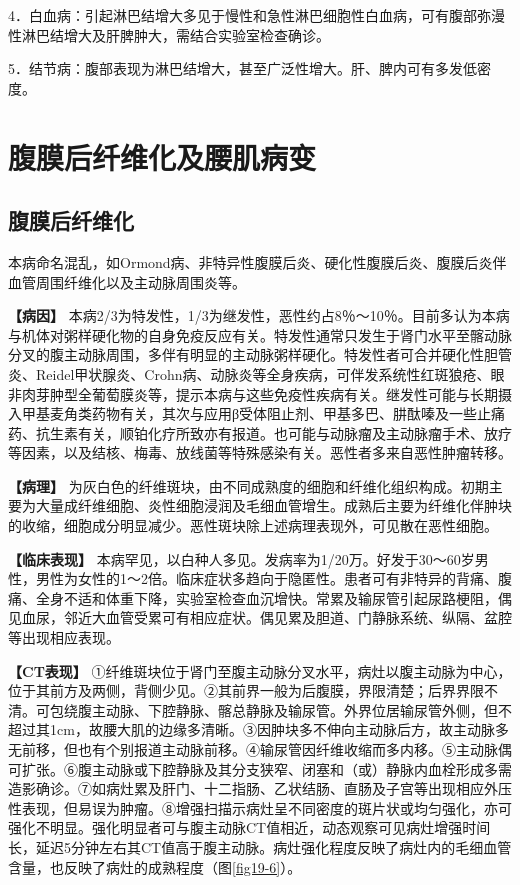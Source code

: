4．白血病：引起淋巴结增大多见于慢性和急性淋巴细胞性白血病，可有腹部弥漫性淋巴结增大及肝脾肿大，需结合实验室检查确诊。

5．结节病：腹部表现为淋巴结增大，甚至广泛性增大。肝、脾内可有多发低密度。

\section{腹膜后纤维化及腰肌病变}

\subsection{腹膜后纤维化}

本病命名混乱，如Ormond病、非特异性腹膜后炎、硬化性腹膜后炎、腹膜后炎伴血管周围纤维化以及主动脉周围炎等。

\textbf{【病因】}
本病2/3为特发性，1/3为继发性，恶性约占8％～10％。目前多认为本病与机体对粥样硬化物的自身免疫反应有关。特发性通常只发生于肾门水平至髂动脉分叉的腹主动脉周围，多伴有明显的主动脉粥样硬化。特发性者可合并硬化性胆管炎、Reidel甲状腺炎、Crohn病、动脉炎等全身疾病，可伴发系统性红斑狼疮、眼非肉芽肿型全葡萄膜炎等，提示本病与这些免疫性疾病有关。继发性可能与长期摄入甲基麦角类药物有关，其次与应用β受体阻止剂、甲基多巴、肼酞嗪及一些止痛药、抗生素有关，顺铂化疗所致亦有报道。也可能与动脉瘤及主动脉瘤手术、放疗等因素，以及结核、梅毒、放线菌等特殊感染有关。恶性者多来自恶性肿瘤转移。

\textbf{【病理】}
为灰白色的纤维斑块，由不同成熟度的细胞和纤维化组织构成。初期主要为大量成纤维细胞、炎性细胞浸润及毛细血管增生。成熟后主要为纤维化伴肿块的收缩，细胞成分明显减少。恶性斑块除上述病理表现外，可见散在恶性细胞。

\textbf{【临床表现】}
本病罕见，以白种人多见。发病率为1/20万。好发于30～60岁男性，男性为女性的1～2倍。临床症状多趋向于隐匿性。患者可有非特异的背痛、腹痛、全身不适和体重下降，实验室检查血沉增快。常累及输尿管引起尿路梗阻，偶见血尿，邻近大血管受累可有相应症状。偶见累及胆道、门静脉系统、纵隔、盆腔等出现相应表现。

\textbf{【CT表现】}
①纤维斑块位于肾门至腹主动脉分叉水平，病灶以腹主动脉为中心，位于其前方及两侧，背侧少见。②其前界一般为后腹膜，界限清楚；后界界限不清。可包绕腹主动脉、下腔静脉、髂总静脉及输尿管。外界位居输尿管外侧，但不超过其1cm，故腰大肌的边缘多清晰。③因肿块多不伸向主动脉后方，故主动脉多无前移，但也有个别报道主动脉前移。④输尿管因纤维收缩而多内移。⑤主动脉偶可扩张。⑥腹主动脉或下腔静脉及其分支狭窄、闭塞和（或）静脉内血栓形成多需造影确诊。⑦如病灶累及肝门、十二指肠、乙状结肠、直肠及子宫等出现相应外压性表现，但易误为肿瘤。⑧增强扫描示病灶呈不同密度的斑片状或均匀强化，亦可强化不明显。强化明显者可与腹主动脉CT值相近，动态观察可见病灶增强时间长，延迟5分钟左右其CT值高于腹主动脉。病灶强化程度反映了病灶内的毛细血管含量，也反映了病灶的成熟程度（图\ref{fig19-6}）。

